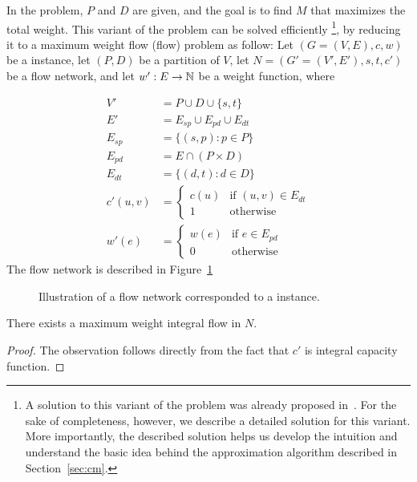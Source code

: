 \label{sec:fixed}
In the \textsc{\FIXEDCARPOOL{}} problem, $P$ and $D$ are given, 
and the goal is to find $M$ that maximizes the total weight. 
This variant of the problem can be solved efficiently
\footnote{A solution to this variant of the problem was already proposed in~\cite{hartman2014theory}.
For the sake of completeness, however, we describe a detailed solution for this variant. 
More importantly, 
the described solution helps us develop the intuition and understand the basic idea behind the
approximation algorithm described in Section~\ref{sec:cm}.   
},
by reducing it to a maximum weight flow (flow) problem as
follow:
Let $(G = (V, E), c, w)$ be a \CARPOOL{} instance,
let $(P, D)$ be a partition of $V$,
let  $N = (G' = (V', E'), s, t, c')$ be a flow network, 
and let $w' : E \rightarrow \mathbb{N}$ be a weight function, where 

\begin{align*}
V'			& = P \cup D \cup \{s, t\}										\\
E'			& = E_{sp} \cup E_{pd} \cup E_{dt}								\\
E_{sp}		& =	\{(s, p) : p \in P \}										\\
E_{pd}		& =	E \cap (P \times D)											\\
E_{dt}		& =	\{(d, t) : d \in D \}										\\
c'(u, v)	& = 
				\begin{cases}
				c(u) & \text{if } (u, v) \in E_{dt} 						\\
				1 & \text{otherwise}
				\end{cases}
																			\\
w'(e)			& = 
				\begin{cases}
				w(e) & \text{if } e \in E_{pd} 								\\
				0 & \text{otherwise}	
				\end{cases}
\end{align*}
The flow network is described in Figure~\ref{fig:flow}
\begin{figure}
\centering

\caption{
\label{fig:flow}
Illustration of a flow network corresponded to a \FIXEDCARPOOL{} instance.}
\end{figure}

\begin{observation}
There exists a maximum weight integral flow in $N$.
\end{observation}

\begin{proof}
The observation follows directly from the fact that $c'$ is integral capacity function.
\end{proof}

